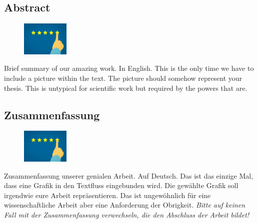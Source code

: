 \begin{spacing}{1}
    \chapter*{Abstract}
\end{spacing}
\begin{figure}
    \begin{center}
      \includegraphics[width=0.2\textwidth]{pics/feedback_stars.jpg}
    \end{center}
\end{figure}
Brief summary of our amazing work. In English.
This is the only time we have to include a picture within the text.
The picture should somehow represent your thesis.
This is untypical for scientific work but required by the powers that are.

\newpage
\begin{spacing}{1}
    \chapter*{Zusammenfassung}
\end{spacing}
\begin{figure}
    \begin{center}
      \includegraphics[width=0.2\textwidth]{pics/feedback_stars.jpg}
    \end{center}
\end{figure}
Zusammenfassung unserer genialen Arbeit. Auf Deutsch.
Das ist das einzige Mal, dass eine Grafik in den Textfluss eingebunden wird.
Die gewählte Grafik soll irgendwie eure Arbeit repräsentieren.
Das ist ungewöhnlich für eine wissenschaftliche Arbeit aber eine Anforderung der Obrigkeit.
\emph{Bitte auf keinen Fall mit der Zusammenfassung verwechseln, die den Abschluss der Arbeit bildet!}
